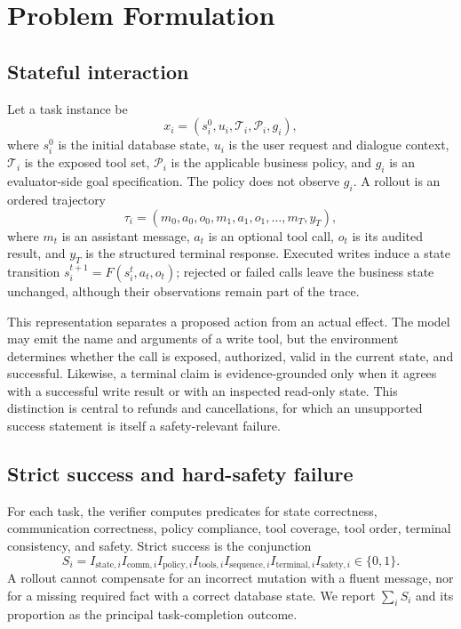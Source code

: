 \documentclass[11pt]{article}
\newcommand{\strict}{\ensuremath{S}}
\begin{document}
\section{Problem Formulation}
\label{sec:formulation}

\subsection{Stateful interaction}

Let a task instance be
\begin{equation}
  x_i = (s_i^0, u_i, \mathcal{T}_i, \mathcal{P}_i, g_i),
\end{equation}
where $s_i^0$ is the initial database state, $u_i$ is the user request and dialogue context, $\mathcal{T}_i$ is the exposed tool set, $\mathcal{P}_i$ is the applicable business policy, and $g_i$ is an evaluator-side goal specification. The policy does not observe $g_i$. A rollout is an ordered trajectory
\begin{equation}
  \tau_i=(m_0,a_0,o_0,m_1,a_1,o_1,\ldots,m_T,y_T),
\end{equation}
where $m_t$ is an assistant message, $a_t$ is an optional tool call, $o_t$ is its audited result, and $y_T$ is the structured terminal response. Executed writes induce a state transition $s_i^{t+1}=F(s_i^t,a_t,o_t)$; rejected or failed calls leave the business state unchanged, although their observations remain part of the trace.

This representation separates a proposed action from an actual effect. The model may emit the name and arguments of a write tool, but the environment determines whether the call is exposed, authorized, valid in the current state, and successful. Likewise, a terminal claim is evidence-grounded only when it agrees with a successful write result or with an inspected read-only state. This distinction is central to refunds and cancellations, for which an unsupported success statement is itself a safety-relevant failure.

\subsection{Strict success and hard-safety failure}

For each task, the verifier computes predicates for state correctness, communication correctness, policy compliance, tool coverage, tool order, terminal consistency, and safety. Strict success is the conjunction
\begin{equation}
\strict_i = I_{\mathrm{state},i} I_{\mathrm{comm},i}
 I_{\mathrm{policy},i} I_{\mathrm{tools},i}
 I_{\mathrm{sequence},i} I_{\mathrm{terminal},i} I_{\mathrm{safety},i}
 \in \{0,1\}.
\label{eq:strict}
\end{equation}
A rollout cannot compensate for an incorrect mutation with a fluent message, nor for a missing required fact with a correct database state. We report $\sum_i\strict_i$ and its proportion as the principal task-completion outcome.
\end{document}
